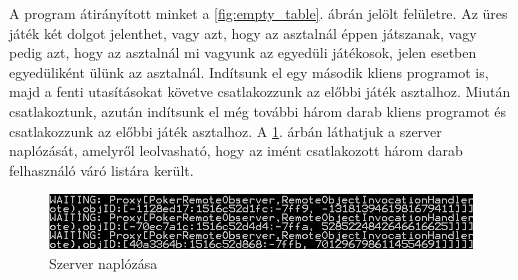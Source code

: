A program átirányított minket a \ref{fig:empty_table}. ábrán jelölt felületre. Az üres játék két dolgot jelenthet, vagy azt, hogy az asztalnál éppen játszanak, vagy pedig azt, hogy az asztalnál mi vagyunk az egyedüli játékosok, jelen esetben egyedüliként ülünk az asztalnál. Indítsunk el egy második kliens programot is, majd a fenti utasításokat követve csatlakozzunk az előbbi játék asztalhoz. Miután csatlakoztunk, azután indítsunk el még további három darab kliens programot és csatlakozzunk az előbbi játék asztalhoz. A \ref{fig:sv_log}. árbán láthatjuk a szerver naplózását, amelyről leolvasható, hogy az imént csatlakozott három darab felhasználó váró listára került. \\
\begin{figure}[h!]
  \caption{Szerver naplózása}
  \label{fig:sv_log}
  \centering
    \includegraphics[width=\textwidth]{user-documentation/images/sv_log.jpg}
\end{figure}

